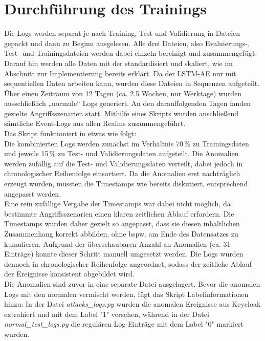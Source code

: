 \documentclass[a4paper,12pt]{article}
\begin{document}
	\section{Durchführung des Trainings}
	Die Logs werden separat je nach Training, Test und Validierung in Dateien gepackt und dann zu Beginn ausgelesen. Alle drei Dateien, also Evaluierungs-, Test- und Trainingsdateien werden dabei einzeln bereinigt und zusammengefügt. Darauf hin werden alle Daten mit der standardisiert und skaliert, wie im Abschnitt zur Implementierung bereits erklärt. Da der LSTM-AE nur mit sequentiellen Daten arbeiten kann, wurden diese Dateien in Sequenzen aufgeteilt.
	\\[0.5em]
	Über einen Zeitraum von 12 Tagen (ca. 2.5 Wochen, nur Werktage) wurden ausschließlich „normale“ Logs generiert. An den darauffolgenden Tagen fanden gezielte Angriffsszenarien statt. Mithilfe eines Skripts wurden anschließend sämtliche Event-Logs aus allen Realms zusammengeführt. 
	\\[0.5em]
	Das Skript funktioniert in etwas wie folgt:
	\\[0.5em]
	Die kombinierten Logs werden zunächst im Verhältnis 70\,\% zu Trainingsdaten und jeweils 15\,\% zu Test- und Validierungsdaten aufgeteilt. Die Anomalien werden zufällig auf die Test- und Validierungsdaten verteilt, dabei jedoch in chronologischer Reihenfolge einsortiert. Da die Anomalien erst nachträglich erzeugt wurden, mussten die Timestamps wie bereits diskutiert, entsprechend angepasst werden.
	\\[0.5em]
	Eine rein zufällige Vergabe der Timestamps war dabei nicht möglich, da bestimmte Angriffsszenarien einen klaren zeitlichen Ablauf erfordern. Die Timestamps wurden daher gezielt so angepasst, dass sie diesen inhaltlichen Zusammenhang korrekt abbilden, ohne bspw. am Ende des Datensatzes zu kumulieren. Aufgrund der überschaubaren Anzahl an Anomalien (ca. 31 Einträge) konnte dieser Schritt manuell umgesetzt werden. Die Logs wurden dennoch in chronologischer Reihenfolge angeordnet, sodass der zeitliche Ablauf der Ereignisse konsistent abgebildet wird.
	\\[0.5em]
	Die Anomalien sind zuvor in eine separate Datei ausgelagert. Bevor die anomalen Logs mit den normalen vermischt werden, fügt das Skript Labelinformationen hinzu: In der Datei \textit{attacks\_logs.py} wurden die anomalen Ereignisse aus Keycloak extrahiert und mit dem Label "1"  versehen, während in der Datei \textit{normal\_test\_logs.py} die regulären Log-Einträge mit dem Label "0"  markiert wurden.
	\\[0.5em]
\end{document}
